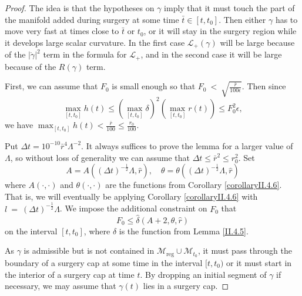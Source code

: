 \documentclass[12pt]{amsart}
\newcommand{\De}{\Delta}
\renewcommand{\L}{{\mathcal L}}
\newcommand{\La}{\Lambda}
\newcommand{\M}{{\mathcal M}}
\newcommand{\reg}{\operatorname{reg}}
\renewcommand{\th}{\theta}
\newcommand{\de}{\delta}
\newcommand{\eps}{\epsilon}
\newcommand{\ga}{\gamma}
\numberwithin{equation}{section}
\theoremstyle{plain}
\theoremstyle{definition}
\theoremstyle{remark}
\begin{document}
\begin{proof}
The idea is that the hypotheses on  $\ga$  imply that it must touch the
part of the manifold added during surgery at some time $\bar t\in[t,t_0]$.  
Then either $\ga$ has to move very fast at times close to $\bar t$ or
$t_0$, or it
will stay in the surgery region while it develops large
scalar curvature. In the first case $\L_+(\ga)$ will be large because
of the $|\dot{\ga}|^2$ term in the formula for $\L_+$, 
and in the second case it will be large because of 
the $R(\ga)$ term.

First, we can assume that $F_0$ is small enough so that
$F_0 \: < \: \sqrt{\frac{\bar r}{100 \epsilon}}$.
Then since
\begin{equation}
\label{h<<r}
\max_{[t,t_0]}h(t)\leq \left(\max_{[t,t_0]}\de\right)^2
\left(\max_{[t,t_0]}r(t)\right)\leq F_0^2\eps,
\end{equation}
we have $\max_{[t,t_0]}h(t)
<\frac{\bar r}{100}\leq  \frac{r_0}{100}$.

Put 
$\De t=10^{-10} \bar r^4\La^{-2}$.
It always suffices to prove 
the lemma for a larger value of $\La$,
so without loss of generality we can assume that
$\De t\leq \bar r^2\leq r_0^2$. Set 
\begin{equation}
\label{aandthetaconditions}
A=A((\De t)^{-\frac12}\La,\hat r),\quad 
\th=\th((\De t)^{-\frac12}\La,\hat r)
\end{equation}
where $A(\cdot,\cdot)$ and $\th(\cdot,\cdot)$
are  the functions from Corollary \ref{corollaryII.4.6}.
That is, we will eventually be applying Corollary \ref{corollaryII.4.6}
with $l \: = \: (\De t)^{-\frac12}\La$.
We impose the additional constraint on $F_0$ that
\begin{equation}
\label{deltasmall}
 F_0\leq \hat\de(A+2,\th,\hat r)
\end{equation}
on the interval $[t, t_0]$,
where $\hat\de $ is the function from Lemma \ref{II.4.5}.

As $\gamma$ is admissible but is not contained in $\M_{\reg}\cup\M_{t_0}$,
it must pass through the boundary of a surgery cap at some time
in the interval $[t, t_0)$ or it must start in the interior of a
surgery cap at time $t$.
By dropping an initial segment of $\ga$
if necessary, we may assume that $\ga(t)$ lies in a
surgery cap. 


\end{proof}
\end{document}
